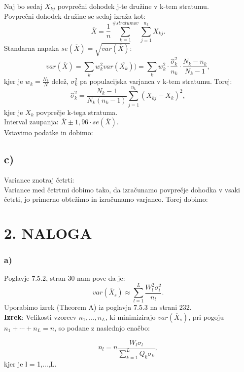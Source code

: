 \documentclass{article}
\begin{document}
Naj bo sedaj $X_{kj}$ povprečni dohodek j-te družine v k-tem stratumu.\\
Povprečni dohodek družine se sedaj izraža kot:
\begin{equation*}
\overline{X} = \frac{1}{n} \sum_{k=1}^{\# stratumov} \sum_{j=1}^{n_k} X_{kj}.
\end{equation*}
Standarna napaka $se(\overline{X}) = \sqrt{var( \overline{X})}$:
\begin{equation*}
var(\overline{X}) = \sum_k w_k^2 var(\overline{X_k}))  = \sum_k w_k^2 \cdot \frac{\hat{\sigma}_k^2}{n_k} \cdot \frac{N_k-n_k}{N_k-1},
\end{equation*}
kjer je $w_k = \frac{N_k}{N}$ delež, $\sigma_k^2$ pa populacijska varjanca v k-tem stratumu. Torej:
\begin{equation*}
\hat{\sigma}_k^2 = \frac{N_k-1}{N_k(n_k-1)} \sum_{j=1}^{n_k} (X_{kj}-\overline{X_k})^2,
\end{equation*}
kjer je $X_k$ povprečje k-tega stratuma.\\
Interval zaupanja: $\overline{X} \pm 1,96 \cdot se(\overline{X})$. \\
Vstavimo podatke in dobimo:


\subsection*{c)}
Variance znotraj četrti:\\
Variance med četrtmi dobimo tako, da izračunamo povprečje dohodka v vsaki četrti, jo primerno obtežimo in izračunamo varjanco. Torej dobimo:

\section*{2. NALOGA}
\subsubsection*{a)}
Poglavje 7.5.2, stran 30 nam pove da je:
\begin{equation*}
var(\overline{X}_s) \approx \sum_{l=1}^L \frac{W_l^2 \sigma_l^2}{n_l}.
\end{equation*}
Uporabimo izrek (Theorem A) iz poglavja 7.5.3 na strani 232. \\
\textbf{Izrek}: Velikosti vzorcev $n_1,...,n_L$, ki minimizirajo $var(\overline{X}_s)$, pri pogoju $n_1+\cdots + n_L = n$, so podane z naslednjo enačbo:

\begin{equation*}
n_l = n\frac{W_l \sigma_l}{\sum_{k=1}^L Q_k\sigma_k},
\end{equation*}
kjer je l = 1,...,L.\\
\end{document}
